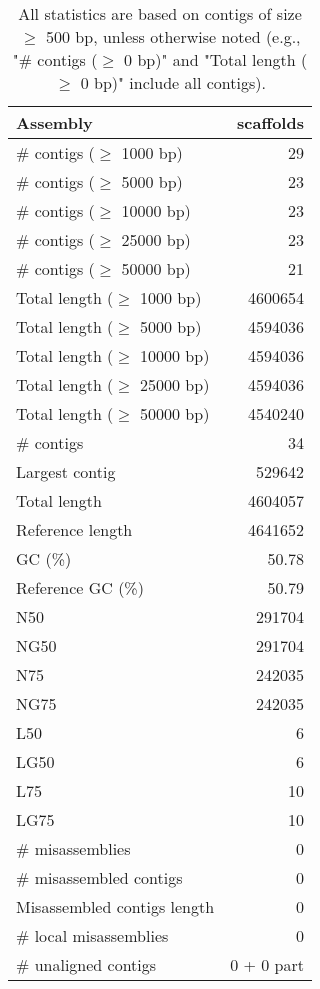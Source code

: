 \documentclass[12pt,a4paper]{article}
\begin{document}
\begin{table}[ht]
\begin{center}
\caption{All statistics are based on contigs of size $\geq$ 500 bp, unless otherwise noted (e.g., "\# contigs ($\geq$ 0 bp)" and "Total length ($\geq$ 0 bp)" include all contigs).}
\begin{tabular}{|l*{1}{|r}|}
\hline
Assembly & scaffolds \\ \hline
\# contigs ($\geq$ 1000 bp) & 29 \\ \hline
\# contigs ($\geq$ 5000 bp) & 23 \\ \hline
\# contigs ($\geq$ 10000 bp) & 23 \\ \hline
\# contigs ($\geq$ 25000 bp) & 23 \\ \hline
\# contigs ($\geq$ 50000 bp) & 21 \\ \hline
Total length ($\geq$ 1000 bp) & 4600654 \\ \hline
Total length ($\geq$ 5000 bp) & 4594036 \\ \hline
Total length ($\geq$ 10000 bp) & 4594036 \\ \hline
Total length ($\geq$ 25000 bp) & 4594036 \\ \hline
Total length ($\geq$ 50000 bp) & 4540240 \\ \hline
\# contigs & 34 \\ \hline
Largest contig & 529642 \\ \hline
Total length & 4604057 \\ \hline
Reference length & 4641652 \\ \hline
GC (\%) & 50.78 \\ \hline
Reference GC (\%) & 50.79 \\ \hline
N50 & 291704 \\ \hline
NG50 & 291704 \\ \hline
N75 & 242035 \\ \hline
NG75 & 242035 \\ \hline
L50 & 6 \\ \hline
LG50 & 6 \\ \hline
L75 & 10 \\ \hline
LG75 & 10 \\ \hline
\# misassemblies & 0 \\ \hline
\# misassembled contigs & 0 \\ \hline
Misassembled contigs length & 0 \\ \hline
\# local misassemblies & 0 \\ \hline
\# unaligned contigs & 0 + 0 part \\ \hline

\end{tabular}
\end{center}
\end{table}
\end{document}
